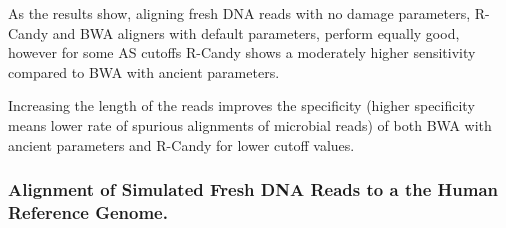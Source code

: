 \documentclass[11pt,a4paper]{report}
\begin{document}
As the results show, aligning fresh DNA reads with no damage parameters, 
R-Candy and BWA aligners with default parameters, perform equally good, 
however for some AS cutoffs R-Candy shows a moderately higher sensitivity 
compared to BWA with ancient parameters.

Increasing the length of the reads improves the specificity (higher
specificity means lower rate of spurious alignments of microbial reads)
of both BWA with ancient parameters and R-Candy for lower cutoff values.



\subsubsection{ Alignment of Simulated Fresh DNA Reads to a the Human Reference Genome.}
\label{ Alignment of Simulated Fresh DNA Reads to a the Human Reference Genome.}
\end{document}
